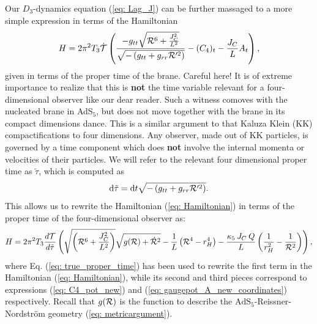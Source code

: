 Our $D_{3}$-dynamics equation (\ref{eq: Lag_J}) can be further massaged to a more simple expression in terms of the Hamiltonian
\begin{equation}\label{eq: Hamiltonian}
    H=2\pi^2 T_3 \dot{\mathcal{T}} \left( \frac{-g_{tt} \sqrt{\mathcal{R}^6 + \frac{J_C^2}{L^2}}}{\sqrt{ -\left(g_{tt}+g_{rr} \mathcal{R}'^2 \right)}} -(C_4)_t  - \frac{J_C}{L}A_t \right),
\end{equation}
given in terms of the proper time of the brane. Careful here! It is of extreme importance to realize that this is \textbf{not} the time variable relevant for a four-dimensional observer like our dear reader. Such a witness comoves with the nucleated brane in AdS$_5$, but does not move together with the brane in its compact dimensions dance. This is a similar argument to that Kaluza Klein (KK) compactifications to four dimensions. Any observer, made out of KK particles, is governed by a time component which does \textbf{not} involve the internal momenta or velocities of their particles. We will refer to the relevant four dimensional proper time as $\tilde{\tau}$, which is computed as
\begin{equation}\label{eq: true_proper_time}
    \text{d} \tilde{\tau} = \text{d} t \sqrt{ -\left(g_{tt}+g_{rr} \mathcal{R}'^2 \right) }.
\end{equation}
This allows us to rewrite the Hamiltonian (\ref{eq: Hamiltonian}) in terms of the proper time of the four-dimensional observer as:
\begin{equation} \label{eq: rewritten_hamiltonian}
    H= 2\pi^2 T_3 \frac{d\mathcal{T}}{d \tilde{\tau}} \left( \sqrt{\left(\mathcal{R}^6 + \frac{J_C^2}{L^2}\right) }\sqrt{ g(\mathcal{R} )+\dot{\mathcal{R}}^2  }-\frac{1}{L} \left(\mathcal{R}^4-r_H^4\right) - \frac{\kappa_{5}\:J_C \:Q}{L}\left(\frac{1}{r_H^2}-\frac{1}{\mathcal{R}^2} \right)\right),
\end{equation}
where Eq. (\ref{eq: true_proper_time}) has been used to rewrite the first term in the Hamiltonian (\ref{eq: Hamiltonian}), while its second and third pieces correspond to expressions (\ref{eq: C4_pot_new}) and (\ref{eq: gaugepot_A_new_coordinates}) respectively. Recall that $g(\mathcal{R})$ is the function to describe the $\text{AdS}_{5}$-Reissner-Nordström geometry (\ref{eq: metricargument}).

